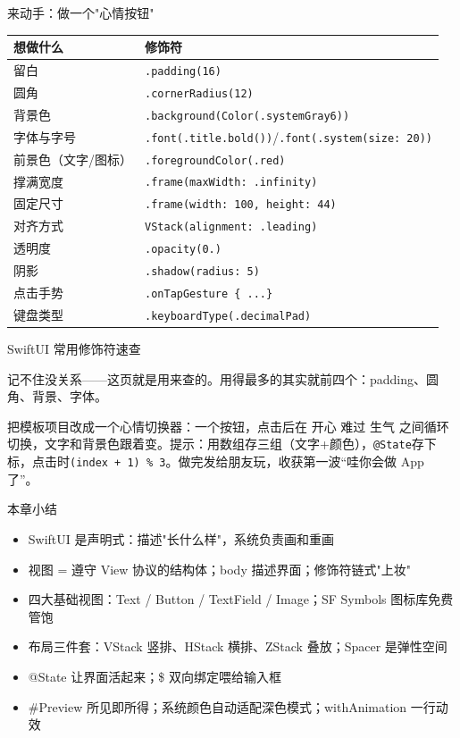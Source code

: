 \begin{tcbpractice}{来动手：做一个"心情按钮"}

\begin{center}
\begin{tabularx}{\linewidth}{|X|X|}
\hline
\textbf{想做什么} & \textbf{修饰符} \tabularnewline
\hline
留白 & \texttt{.\allowbreak padding(16)} \tabularnewline
圆角 & \texttt{.\allowbreak cornerRadius(12)} \tabularnewline
背景色 & \texttt{.\allowbreak background(Color(.\allowbreak systemGray6))} \tabularnewline
字体与字号 & \texttt{.\allowbreak font(.\allowbreak title.\allowbreak bold())}/\texttt{.\allowbreak font(.\allowbreak system(size: 20))} \tabularnewline
前景色（文字/图标） & \texttt{.\allowbreak foregroundColor(.\allowbreak red)} \tabularnewline
撑满宽度 & \texttt{.\allowbreak frame(maxWidth: .\allowbreak infinity)} \tabularnewline
固定尺寸 & \texttt{.\allowbreak frame(width: 100, height: 44)} \tabularnewline
对齐方式 & \texttt{VStack(alignment: .\allowbreak leading)} \tabularnewline
透明度 & \texttt{.\allowbreak opacity(0.\allowbreak 6)} \tabularnewline
阴影 & \texttt{.\allowbreak shadow(radius: 5)} \tabularnewline
点击手势 & \texttt{.\allowbreak onTapGesture \{ .\allowbreak .\allowbreak .\allowbreak  \}} \tabularnewline
键盘类型 & \texttt{.\allowbreak keyboardType(.\allowbreak decimalPad)} \tabularnewline
\hline
\end{tabularx}
\end{center}

\begin{center}\small\color{gray}SwiftUI 常用修饰符速查\end{center}

记不住没关系——这页就是用来查的。用得最多的其实就前四个：padding、圆角、背景、字体。

把模板项目改成一个心情切换器：一个按钮，点击后在 开心 难过 生气 之间循环切换，文字和背景色跟着变。提示：用数组存三组（文字+颜色），\texttt{@State}存下标，点击时\texttt{(index + 1) \% 3}。做完发给朋友玩，收获第一波“哇你会做 App 了”。

\end{tcbpractice}

\begin{tcbsummary}{本章小结}
\begin{itemize}
  \item SwiftUI 是声明式：描述"长什么样"，系统负责画和重画
  \item 视图 = 遵守 View 协议的结构体；body 描述界面；修饰符链式"上妆"
  \item 四大基础视图：Text / Button / TextField / Image；SF Symbols 图标库免费管饱
  \item 布局三件套：VStack 竖排、HStack 横排、ZStack 叠放；Spacer 是弹性空间
  \item @State 让界面活起来；\$ 双向绑定喂给输入框
  \item \#Preview 所见即所得；系统颜色自动适配深色模式；withAnimation 一行动效
\end{itemize}

\end{tcbsummary}
